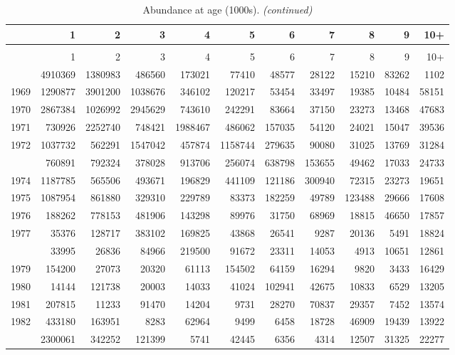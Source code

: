 \documentclass[
]{article}
\begin{document}
\begin{longtable}[t]{lrrrrrrrrrr}
\caption{\label{tab:NAA-table}Abundance at age (1000s).}\\
\toprule
  & 1 & 2 & 3 & 4 & 5 & 6 & 7 & 8 & 9 & 10+\\
\midrule
\endfirsthead
\caption[]{Abundance at age (1000s). \textit{(continued)}}\\
\toprule
  & 1 & 2 & 3 & 4 & 5 & 6 & 7 & 8 & 9 & 10+\\
\midrule
\endhead

\endfoot
\bottomrule
\endlastfoot
1968 & 4910369 & 1380983 & 486560 & 173021 & 77410 & 48577 & 28122 & 15210 & 83262 & 1102\\
1969 & 1290877 & 3901200 & 1038676 & 346102 & 120217 & 53454 & 33497 & 19385 & 10484 & 58151\\
1970 & 2867384 & 1026992 & 2945629 & 743610 & 242291 & 83664 & 37150 & 23273 & 13468 & 47683\\
1971 & 730926 & 2252740 & 748421 & 1988467 & 486062 & 157035 & 54120 & 24021 & 15047 & 39536\\
1972 & 1037732 & 562291 & 1547042 & 457874 & 1158744 & 279635 & 90080 & 31025 & 13769 & 31284\\
\addlinespace
1973 & 760891 & 792324 & 378028 & 913706 & 256074 & 638798 & 153655 & 49462 & 17033 & 24733\\
1974 & 1187785 & 565506 & 493671 & 196829 & 441109 & 121186 & 300940 & 72315 & 23273 & 19651\\
1975 & 1087954 & 861880 & 329310 & 229789 & 83373 & 182259 & 49789 & 123488 & 29666 & 17608\\
1976 & 188262 & 778153 & 481906 & 143298 & 89976 & 31750 & 68969 & 18815 & 46650 & 17857\\
1977 & 35376 & 128717 & 383102 & 169825 & 43868 & 26541 & 9287 & 20136 & 5491 & 18824\\
\addlinespace
1978 & 33995 & 26836 & 84966 & 219500 & 91672 & 23311 & 14053 & 4913 & 10651 & 12861\\
1979 & 154200 & 27073 & 20320 & 61113 & 154502 & 64159 & 16294 & 9820 & 3433 & 16429\\
1980 & 14144 & 121738 & 20003 & 14033 & 41024 & 102941 & 42675 & 10833 & 6529 & 13205\\
1981 & 207815 & 11233 & 91470 & 14204 & 9731 & 28270 & 70837 & 29357 & 7452 & 13574\\
1982 & 433180 & 163951 & 8283 & 62964 & 9499 & 6458 & 18728 & 46909 & 19439 & 13922\\
\addlinespace
1983 & 2300061 & 342252 & 121399 & 5741 & 42445 & 6356 & 4314 & 12507 & 31325 & 22277\\

\end{longtable}
\end{document}
